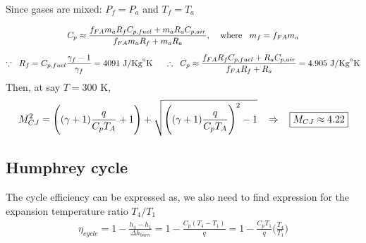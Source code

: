 \documentclass[a4paper,10pt]{article}
\begin{document}
Since gases are mixed: $P_f = P_a$ and $T_f = T_a$

\vspace*{-0.5cm}
\begin{gather*}
    C_p\approx\frac{f_{FA}m_aR_fC_{p,fuel}+m_aR_aC_{p,air}}{f_{FA}m_aR_f+m_aR_a},\hspace*{0.4cm}\text{where}\hspace*{0.3cm}m_f = f_{FA}m_a\\[0.2cm]
    \because\hspace*{0.2cm}R_f = C_{p,fuel}\frac{\gamma_f-1}{\gamma_f} = 4091\text{ J/Kg}^{\circ}\text{K}\hspace*{0.5cm}\therefore\hspace*{0.2cm}C_p \approx\frac{f_{FA}R_fC_{p,fuel}+R_aC_{p,air}}{f_{FA}R_f+R_a} = 4.905\text{ J/Kg}^{\circ}\text{K}
\end{gather*}
Then, at say $T = 300$ K,
\begin{gather*}
    M_{CJ}^2 = \Bigg((\gamma+1)\frac{q}{C_pT_A}+1\Bigg)+\sqrt{\Bigg((\gamma+1)\frac{q}{C_pT_A}\Bigg)^2-1}\hspace*{0.3cm}\Rightarrow\hspace*{0.3cm}\boxed{M_{CJ} \approx4.22}
\end{gather*}

\subsection{Humphrey cycle}
The cycle efficiency can be expressed as, we also need to find expression for the expansion temperature ratio $T_4/T_1$
\begin{gather*}
    \eta_{cycle} = 1-\frac{h_4-h_1}{\Delta h_{burn}}=1-\frac{C_p(T_4-T_1)}{q} = 1-\frac{C_pT_1}{q}\Bigg(\frac{T_4}{T_1}\Bigg)
\end{gather*}
\end{document}
